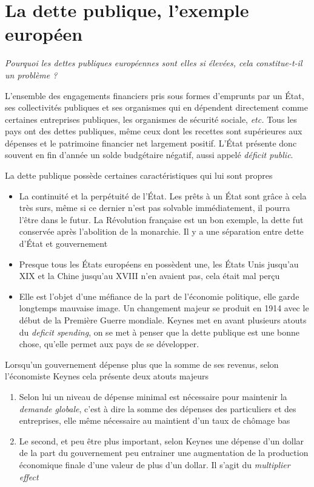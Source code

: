 \documentclass[main.tex]{subfiles}
\begin{document}
\chapter{La dette publique, l'exemple européen}

\textit{Pourquoi les dettes publiques européennes sont elles si élevées, cela constitue-t-il un problème ?}

\begin{definition}
        L'ensemble des engagements financiers pris sous formes d'emprunts par un État, ses collectivités publiques et ses organismes qui en dépendent directement comme certaines entreprises publiques, les organismes de sécurité sociale, \textit{etc.}
        Tous les pays ont des dettes publiques, même ceux dont les recettes sont supérieures aux dépenses et le patrimoine financier net largement positif. L’État présente donc souvent en fin d’année un solde budgétaire négatif, aussi appelé \emph{déficit public}.
\end{definition}

La dette publique possède certaines caractéristiques qui lui sont propres
\begin{itemize}
        \item La continuité et la perpétuité de l'État. Les prêts à un État sont grâce à cela très surs, même si ce dernier n'est pas solvable immédiatement, il pourra l'être dans le futur. La Révolution française est un bon exemple, la dette fut conservée après l'abolition de la monarchie. Il y a une séparation entre dette d'État et gouvernement
        \item Presque tous les États européens en possèdent une, les États Unis jusqu'au XIX et la Chine jusqu'au XVIII n'en avaient pas, cela était mal perçu
        \item Elle est l'objet d'une méfiance de la part de l'économie politique, elle garde longtemps mauvaise image. Un changement majeur se produit en 1914 avec le début de la Première Guerre mondiale. Keynes met en avant plusieurs atouts du \emph{deficit spending}, on se met à penser que la dette publique est une bonne chose, qu'elle permet aux pays de se développer.
\end{itemize}

\begin{definition}
        Lorsqu'un gouvernement dépense plus que la somme de ses revenus, selon l'économiste Keynes cela présente deux atouts majeurs
        \begin{enumerate}
                \item Selon lui un niveau de dépense minimal est nécessaire pour maintenir la \emph{demande globale}, c'est à dire la somme des dépenses des particuliers et des entreprises, elle même nécessaire au maintient d'un taux de chômage bas
                \item Le second, et peu être plus important, selon Keynes une dépense d'un dollar de la part du gouvernement peu entrainer une augmentation de la production économique finale d'une valeur de plus d'un dollar. Il s'agit du \emph{multiplier effect}
        \end{enumerate}
\end{definition}
\end{document}
